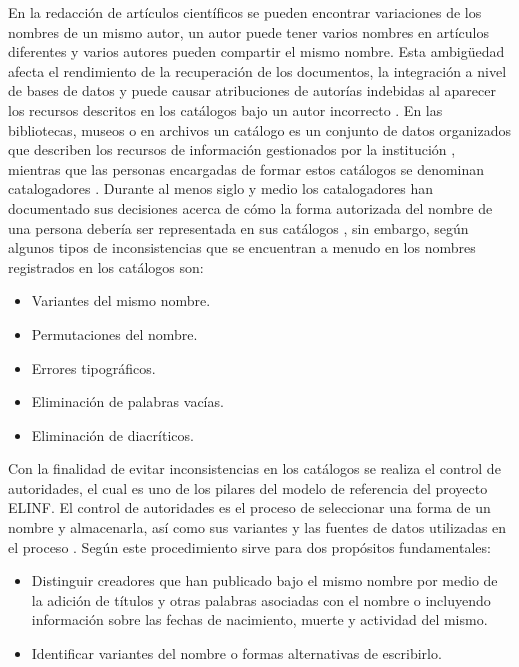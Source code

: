 En la redacción de artículos científicos se pueden encontrar variaciones de los nombres de un mismo autor, un autor puede tener varios nombres en artículos diferentes y varios autores pueden compartir el mismo nombre. Esta ambigüedad afecta el rendimiento de la recuperación de los documentos, la integración a nivel de bases de datos y puede causar atribuciones de autorías indebidas al aparecer los recursos descritos en los catálogos bajo un autor incorrecto \citep{Han2005}. En las bibliotecas, museos o en archivos un catálogo es un conjunto de datos organizados que describen los recursos de información gestionados por la institución \citep{InternationalFederationofLibraryAssociationsandInstitutions2009}, mientras que las personas encargadas de formar estos catálogos se denominan catalogadores \citep{RealAcademiaEspanola2014}. Durante al menos siglo y medio los catalogadores han documentado sus decisiones acerca de cómo la forma autorizada del nombre de una persona debería ser representada en sus catálogos \citep{Tillett2009}, sin embargo, según \cite{Carrasco2016} algunos tipos de inconsistencias que se encuentran a menudo en los nombres registrados en los catálogos son:

\begin{itemize}
\item Variantes del mismo nombre.
\item Permutaciones del nombre.
\item Errores tipográficos.
\item Eliminación de palabras vacías.
\item Eliminación de diacríticos.
\end{itemize}

Con la finalidad de evitar inconsistencias en los catálogos se realiza el control de autoridades, el cual es uno de los pilares del modelo de referencia del proyecto ELINF. El control de autoridades es el proceso de seleccionar una forma de un nombre y almacenarla, así como sus variantes y las fuentes de datos utilizadas en el proceso \citep{Sandberg2016}. Según \cite{Carrasco2016} este procedimiento sirve para dos propósitos fundamentales:

\begin{itemize}
\item Distinguir creadores que han publicado bajo el mismo nombre por medio de la adición de títulos y otras palabras asociadas con el nombre o incluyendo información sobre las fechas de nacimiento, muerte y actividad del mismo.
\item Identificar variantes del nombre o formas alternativas de escribirlo.
\end{itemize}

